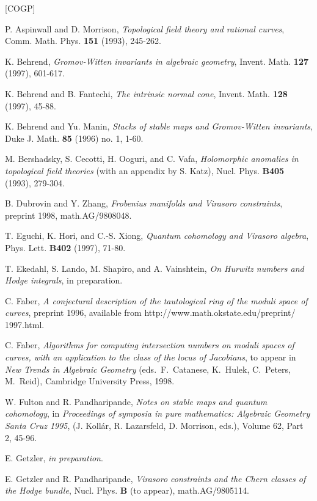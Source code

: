 \documentclass[11 pt]{amsart}
\begin{document}
\begin{thebibliography}{[COGP]}

 P. Aspinwall and D. Morrison, {\em Topological
field theory and rational curves}, Comm. Math. Phys. {\bf 151}
(1993), 245-262.

 K. Behrend, {\em Gromov-Witten invariants
in algebraic geometry}, Invent. Math. {\bf 127} (1997), 601-617.

 K. Behrend and B. Fantechi, {\em The intrinsic normal
cone},  Invent. Math. {\bf 128} (1997), 45-88.

 K. Behrend and Yu. Manin, {\em Stacks of stable
maps and Gromov-Witten invariants}, Duke J. Math. {\bf 85} (1996)
no. 1, 1-60.

 M. Bershadsky, S. Cecotti, H. Ooguri, and C. Vafa, {\em
Holomorphic anomalies in topological field theories} (with an
appendix by S. Katz), Nucl. Phys. {\bf B405} (1993), 279-304.

 B. Dubrovin and Y. Zhang, {\em Frobenius manifolds
and Virasoro constraints}, preprint 1998, math.AG/9808048.

 T. Eguchi, K. Hori, and C.-S. Xiong, {\em
Quantum cohomology and Virasoro algebra}, Phys. Lett. {\bf B402} (1997),
71-80.

 T. Ekedahl, S. Lando, M. Shapiro, and A. Vainshtein,
{\em On Hurwitz numbers and Hodge integrals}, in preparation.

 C. Faber, {\em A conjectural description of the 
tautological ring of the moduli space of curves},
preprint 1996, available from 
http://www.math.okstate.edu/preprint/ 1997.html.

 C. Faber, {\em Algorithms for computing intersection
numbers on moduli spaces of curves, with an application to the class of the
locus of Jacobians},  to appear in {\sl New Trends in Algebraic Geometry\/}
(eds.~F.~Catanese, K.~Hulek, C.~Peters, M.~Reid), Cambridge University
Press, 1998.

 W. Fulton and R. Pandharipande,
{\em Notes on stable maps and quantum cohomology}, in
{\em Proceedings of symposia in pure  mathematics: Algebraic Geometry
Santa Cruz 1995}, (J. Koll\'ar, R. Lazarsfeld, D. Morrison, eds.),
Volume 62, Part 2, 45-96.

 E. Getzler, {\em in preparation}.

 E. Getzler and R. Pandharipande, {\em Virasoro
constraints and the Chern classes of the Hodge bundle},
Nucl. Phys. {\bf B} (to appear), math.AG/9805114.


\end{thebibliography}
\end{document}
